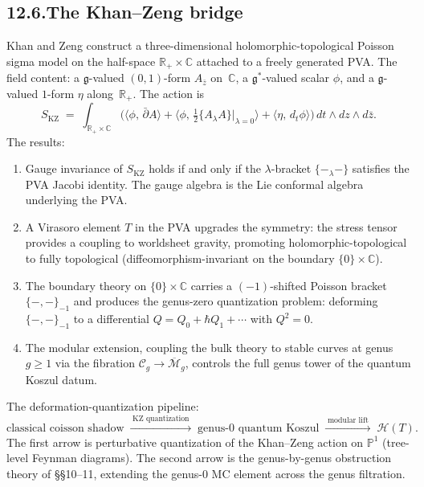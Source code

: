 \documentclass[11pt]{report}
\theoremstyle{definition}
\theoremstyle{remark}
\providecommand{\cC}{\mathcal{C}}
\providecommand{\cM}{\mathcal{M}}
\providecommand{\fg}{\mathfrak{g}}
\numberwithin{equation}{section}
\begin{document}
\subsection*{12.6.\enspace The Khan--Zeng bridge}

Khan and Zeng construct a three-dimensional holomorphic-topological
Poisson sigma model on the half-space
$\mathbb R_+\times\mathbb C$ attached to a freely generated PVA.
The field content: a $\fg$-valued $(0,1)$-form $A_{\bar z}$
on~$\mathbb C$, a $\fg^*$-valued scalar $\phi$, and a
$\fg$-valued $1$-form $\eta$ along~$\mathbb R_+$. The action is
\[
S_{\mathrm{KZ}}
\;=\;
\int_{\mathbb R_+\times\mathbb C}
\bigl(\langle\phi,\,\bar\partial A\rangle
+\langle\phi,\,\tfrac12\{A_\lambda A\}|_{\lambda=0}\rangle
+\langle\eta,\,d_t\phi\rangle\bigr)\,
dt\wedge dz\wedge d\bar z.
\]
The results:
\begin{enumerate}[label=(\roman*)]
\item Gauge invariance of $S_{\mathrm{KZ}}$ holds if and only if
 the $\lambda$-bracket $\{-_\lambda-\}$ satisfies the PVA Jacobi
 identity. The gauge algebra is the Lie conformal algebra
 underlying the PVA.
\item A Virasoro element $T$ in the PVA upgrades the symmetry:
 the stress tensor provides a coupling to worldsheet gravity,
 promoting holomorphic-topological to fully topological
 (diffeomorphism-invariant on the boundary $\{0\}\times\mathbb C$).
\item The boundary theory on $\{0\}\times\mathbb C$ carries a
 $(-1)$-shifted Poisson bracket $\{-,-\}_{-1}$ and produces the
 genus-zero quantization problem: deforming $\{-,-\}_{-1}$ to
 a differential $Q=Q_0+\hbar Q_1+\cdots$ with $Q^2=0$.
\item The modular extension, coupling the bulk theory to stable
 curves at genus $g\ge 1$ via the fibration
 $\cC_g\to\overline{\cM}_g$, controls the full genus tower of
 the quantum Koszul datum.
\end{enumerate}
The deformation-quantization pipeline:
\[
\text{classical coisson shadow}
\;\xrightarrow{\;\text{KZ quantization}\;}\;
\text{genus-$0$ quantum Koszul}
\;\xrightarrow{\;\text{modular lift}\;}\;
\mathcal H(T).
\]
The first arrow is perturbative quantization of the Khan--Zeng
action on $\mathbb P^1$ (tree-level Feynman diagrams). The
second arrow is the genus-by-genus obstruction theory of
\S\S10--11, extending the genus-$0$ MC element across the genus
filtration.
\end{document}

